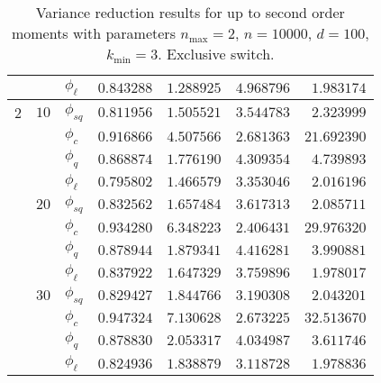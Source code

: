 \begin{table}[htb]
{\begin{tabular}{l@{\hskip 12pt}l@{\hskip 12pt}l@{\hskip 12pt}r@{\hskip 12pt}r@{\hskip 12pt}r@{\hskip 12pt}r}
            &    & $\phi_{\ell}$ &  $0.843288$ &  $1.288925$ &    $4.968796$ &   $1.983174$ \\\midrule
	\num{2} & $10$ &$\phi_{sq}$ &  $0.811956$ &  $1.505521$ &    $3.544783$ &   $2.323999$ \\
            &    &$\phi_{c}$ &  $0.916866$ &  $4.507566$ &    $2.681363$ &  $21.692390$ \\
            &    &$\phi_{q}$ &  $0.868874$ &  $1.776190$ &    $4.309354$ &   $4.739893$ \\
            &    & $\phi_{\ell}$ &  $0.795802$ &  $1.466579$ &    $3.353046$ &   $2.016196$ \\\cmidrule{2-7}
            & $20$ &$\phi_{sq}$ &  $0.832562$ &  $1.657484$ &    $3.617313$ &   $2.085711$ \\
            &    &$\phi_{c}$ &  $0.934280$ &  $6.348223$ &    $2.406431$ &  $29.976320$ \\
            &    &$\phi_{q}$ &  $0.878944$ &  $1.879341$ &    $4.416281$ &   $3.990881$ \\
            &    & $\phi_{\ell}$ &  $0.837922$ &  $1.647329$ &    $3.759896$ &   $1.978017$ \\\cmidrule{2-7}
            & $30$ &$\phi_{sq}$ &  $0.829427$ &  $1.844766$ &    $3.190308$ &   $2.043201$ \\
            &    &$\phi_{c}$ &  $0.947324$ &  $7.130628$ &    $2.673225$ &  $32.513670$ \\
            &    &$\phi_{q}$ &  $0.878830$ &  $2.053317$ &    $4.034987$ &   $3.611746$ \\
            &    & $\phi_{\ell}$ &  $0.824936$ &  $1.838879$ &    $3.118728$ &   $1.978836$ \\
\bottomrule
\end{tabular}}
    \caption[Variance reduction results for up to second order moments]{Variance reduction results for up to second order moments with parameters $n_{\max}=2$, $n=\num{10000}$, $d=100$, $k_{\min}=3$. Exclusive switch.}
    \label{tab:eff1}
\end{table}

